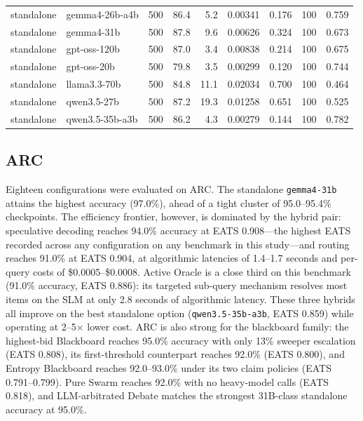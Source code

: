 \begin{table}[htbp]
\begin{tabularx}{\linewidth}{@{} l X r r r r r r r @{}}
standalone & gemma4-26b-a4b & 500 & 86.4 & 5.2 & 0.00341 & 0.176 & 100 & 0.759 \\
standalone & gemma4-31b & 500 & 87.8 & 9.6 & 0.00626 & 0.324 & 100 & 0.673 \\
standalone & gpt-oss-120b & 500 & 87.0 & 3.4 & 0.00838 & 0.214 & 100 & 0.675 \\
standalone & gpt-oss-20b & 500 & 79.8 & 3.5 & 0.00299 & 0.120 & 100 & 0.744 \\
standalone & llama3.3-70b & 500 & 84.8 & 11.1 & 0.02034 & 0.700 & 100 & 0.464 \\
standalone & qwen3.5-27b & 500 & 87.2 & 19.3 & 0.01258 & 0.651 & 100 & 0.525 \\
standalone & qwen3.5-35b-a3b & 500 & 86.2 & 4.3 & 0.00279 & 0.144 & 100 & 0.782 \\
\bottomrule
\end{tabularx}
\end{table}

\subsection{ARC}

Eighteen configurations were evaluated on ARC. The standalone \texttt{gemma4-31b} attains the highest accuracy (97.0\%), ahead of a tight cluster of 95.0--95.4\% checkpoints. The efficiency frontier, however, is dominated by the hybrid pair: speculative decoding reaches 94.0\% accuracy at EATS 0.908---the highest EATS recorded across any configuration on any benchmark in this study---and routing reaches 91.0\% at EATS 0.904, at algorithmic latencies of 1.4--1.7 seconds and per-query costs of \$0.0005--\$0.0008. Active Oracle is a close third on this benchmark (91.0\% accuracy, EATS 0.886): its targeted sub-query mechanism resolves most items on the SLM at only 2.8 seconds of algorithmic latency. These three hybrids all improve on the best standalone option (\texttt{qwen3.5-35b-a3b}, EATS 0.859) while operating at 2--5$\times$ lower cost. ARC is also strong for the blackboard family: the highest-bid Blackboard reaches 95.0\% accuracy with only 13\% sweeper escalation (EATS 0.808), its first-threshold counterpart reaches 92.0\% (EATS 0.800), and Entropy Blackboard reaches 92.0--93.0\% under its two claim policies (EATS 0.791--0.799). Pure Swarm reaches 92.0\% with no heavy-model calls (EATS 0.818), and LLM-arbitrated Debate matches the strongest 31B-class standalone accuracy at 95.0\%.

